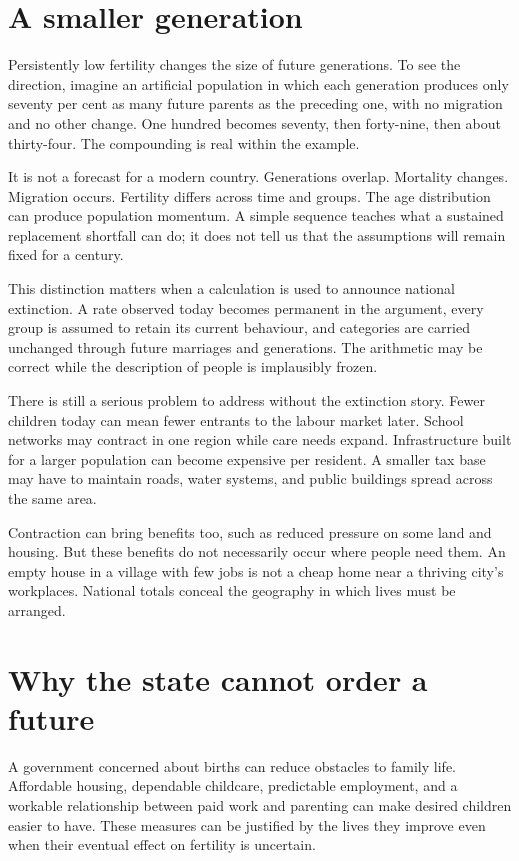 \documentclass[12pt,a4paper]{book}
\begin{document}
\section*{A smaller generation}

Persistently low fertility changes the size of future generations. To see the direction, imagine an artificial population in which each generation produces only seventy per cent as many future parents as the preceding one, with no migration and no other change. One hundred becomes seventy, then forty-nine, then about thirty-four. The compounding is real within the example.

It is not a forecast for a modern country. Generations overlap. Mortality changes. Migration occurs. Fertility differs across time and groups. The age distribution can produce population momentum. A simple sequence teaches what a sustained replacement shortfall can do; it does not tell us that the assumptions will remain fixed for a century.

This distinction matters when a calculation is used to announce national extinction. A rate observed today becomes permanent in the argument, every group is assumed to retain its current behaviour, and categories are carried unchanged through future marriages and generations. The arithmetic may be correct while the description of people is implausibly frozen.

There is still a serious problem to address without the extinction story. Fewer children today can mean fewer entrants to the labour market later. School networks may contract in one region while care needs expand. Infrastructure built for a larger population can become expensive per resident. A smaller tax base may have to maintain roads, water systems, and public buildings spread across the same area.

Contraction can bring benefits too, such as reduced pressure on some land and housing. But these benefits do not necessarily occur where people need them. An empty house in a village with few jobs is not a cheap home near a thriving city's workplaces. National totals conceal the geography in which lives must be arranged.

\section*{Why the state cannot order a future}

A government concerned about births can reduce obstacles to family life. Affordable housing, dependable childcare, predictable employment, and a workable relationship between paid work and parenting can make desired children easier to have. These measures can be justified by the lives they improve even when their eventual effect on fertility is uncertain.
\end{document}
